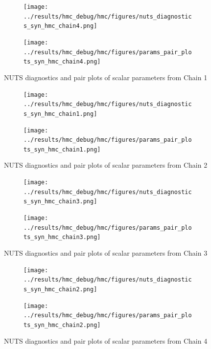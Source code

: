 \documentclass[12pt]{article}
\begin{document}
 \begin{figure}[h!]
   \centering
   \begin{subfigure}{1.0\linewidth}
     \texttt{[image: ../results/hmc\_debug/hmc/figures/nuts\_diagnostics\_syn\_hmc\_chain4.png]}
   \end{subfigure}
   \begin{subfigure}{1.0\linewidth}
     \texttt{[image: ../results/hmc\_debug/hmc/figures/params\_pair\_plots\_syn\_hmc\_chain4.png]}
   \end{subfigure}
   \caption{NUTS diagnostics and pair plots of scalar parameters from Chain 1}
   \label{fig:nuts_diags_chain1}
 \end{figure}
 \begin{figure}[h!]
   \centering
   \begin{subfigure}{1.0\linewidth}
     \texttt{[image: ../results/hmc\_debug/hmc/figures/nuts\_diagnostics\_syn\_hmc\_chain1.png]}
   \end{subfigure}
   \begin{subfigure}{1.0\linewidth}
     \texttt{[image: ../results/hmc\_debug/hmc/figures/params\_pair\_plots\_syn\_hmc\_chain1.png]}
   \end{subfigure}
   \caption{NUTS diagnostics and pair plots of scalar parameters from Chain 2}
   \label{fig:nuts_diags_chain2}
 \end{figure}
 \begin{figure}[h!]
   \centering
   \begin{subfigure}{1.0\linewidth}
     \texttt{[image: ../results/hmc\_debug/hmc/figures/nuts\_diagnostics\_syn\_hmc\_chain3.png]}
   \end{subfigure}
   \begin{subfigure}{1.0\linewidth}
     \texttt{[image: ../results/hmc\_debug/hmc/figures/params\_pair\_plots\_syn\_hmc\_chain3.png]}
   \end{subfigure}
   \caption{NUTS diagnostics and pair plots of scalar parameters from Chain 3}
   \label{fig:nuts_diags_chain3}
 \end{figure}
 \begin{figure}[h!]
   \centering
   \begin{subfigure}{1.0\linewidth}
     \texttt{[image: ../results/hmc\_debug/hmc/figures/nuts\_diagnostics\_syn\_hmc\_chain2.png]}
   \end{subfigure}
   \begin{subfigure}{1.0\linewidth}
     \texttt{[image: ../results/hmc\_debug/hmc/figures/params\_pair\_plots\_syn\_hmc\_chain2.png]}
   \end{subfigure}
   \caption{NUTS diagnostics and pair plots of scalar parameters from Chain 4}
   \label{fig:nuts_diags_chain4}
 \end{figure}
\end{document}
